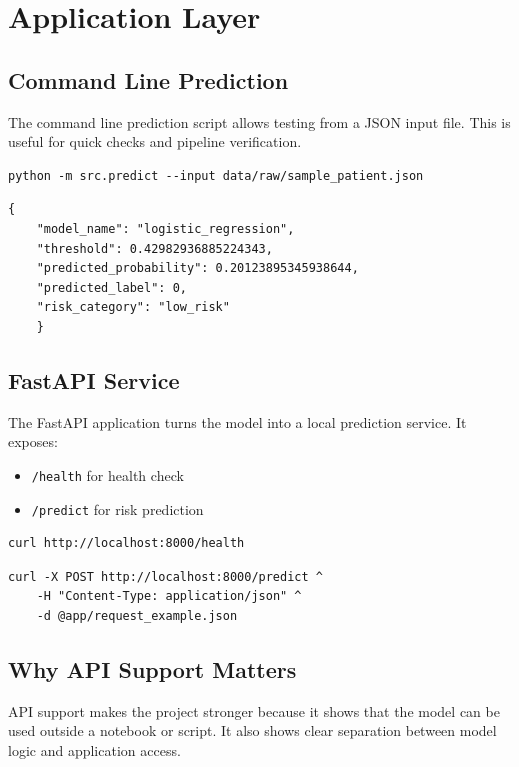 \documentclass[12pt,a4paper,openany]{report}
\begin{document}
    \chapter{Application Layer}
    \section{Command Line Prediction}
    The command line prediction script allows testing from a JSON input file. This is useful for quick checks and pipeline verification.

    \begin{lstlisting}[style=shellstyle,caption={Command line prediction}]
    python -m src.predict --input data/raw/sample_patient.json
    \end{lstlisting}

    \begin{lstlisting}[style=jsonstyle,caption={Saved sample prediction output}]
    {
    "model_name": "logistic_regression",
    "threshold": 0.42982936885224343,
    "predicted_probability": 0.20123895345938644,
    "predicted_label": 0,
    "risk_category": "low_risk"
    }
    \end{lstlisting}

    \section{FastAPI Service}
    The FastAPI application turns the model into a local prediction service. It exposes:
    \begin{itemize}[leftmargin=1.4cm]
    \item \texttt{/health} for health check
    \item \texttt{/predict} for risk prediction
    \end{itemize}

    \begin{lstlisting}[style=shellstyle,caption={Health endpoint}]
    curl http://localhost:8000/health
    \end{lstlisting}

    \begin{lstlisting}[style=shellstyle,caption={Prediction endpoint}]
    curl -X POST http://localhost:8000/predict ^
    -H "Content-Type: application/json" ^
    -d @app/request_example.json
    \end{lstlisting}

    \section{Why API Support Matters}
    API support makes the project stronger because it shows that the model can be used outside a notebook or script. It also shows clear separation between model logic and application access.
\end{document}
